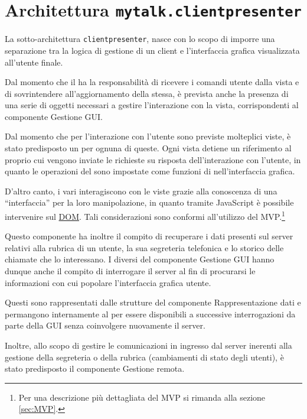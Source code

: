 \section{Architettura \texttt{mytalk.clientpresenter}}\label{sec:clientpresenter}
La sotto-architettura \texttt{clientpresenter}, nasce con lo scopo di imporre una separazione tra la logica di gestione di un client e l'interfaccia grafica visualizzata all'utente finale.

Dal momento che il  ha la responsabilità di ricevere i comandi utente dalla vista e di sovrintendere all'aggiornamento della stessa, è prevista anche la presenza di una serie di oggetti necessari a gestire l'interazione con la vista, corrispondenti al componente \textsf{Gestione GUI}.

Dal momento che per l'interazione con l'utente sono previste molteplici viste, è stato predisposto un  per ognuna di queste. Ogni vista detiene un riferimento al proprio  cui vengono inviate le richieste su risposta dell'interazione con l'utente, in quanto le operazioni del  sono impostate come funzioni di  nell'interfaccia grafica.

D'altro canto, i vari  interagiscono con le viste grazie alla conoscenza di una ``interfaccia'' per la loro manipolazione, in quanto tramite JavaScript è possibile intervenire sul \underline{DOM}\@. Tali considerazioni sono conformi all'utilizzo del  MVP.\footnote{%
  Per una descrizione più dettagliata del  MVP si rimanda alla sezione \ref{sec:MVP}\@.
}

Questo componente ha inoltre il compito di recuperare i dati presenti sul server relativi alla rubrica di un utente, la sua segreteria telefonica e lo storico delle chiamate che lo interessano. I diversi  del componente \textsf{Gestione GUI} hanno dunque anche il compito di interrogare il server al fin di procurarsi le informazioni con cui popolare l'interfaccia grafica utente.

Questi sono rappresentati dalle strutture del componente \textsf{Rappresentazione dati} e permangono internamente al  per essere disponibili a successive interrogazioni da parte della GUI senza coinvolgere nuovamente il server.

Inoltre, allo scopo di gestire le comunicazioni in ingresso dal server inerenti alla gestione della segreteria o della rubrica (cambiamenti di stato degli utenti), è stato predisposto il componente \textsf{Gestione remota}.

